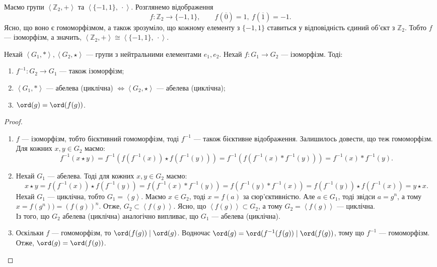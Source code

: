 \documentclass{math_library}
\begin{document}
\begin{example}
Маємо групи $\left<\mathbb{Z}_2,+ \right>$ та $\left< \{-1,1\},\ \cdot \right>$. Розглянемо відображення \[ 
f \colon \mathbb{Z}_2 \to \{-1,1\}, \qquad f(\overline{0}) = 1,\ f(\overline{1}) = -1.
\]
Ясно, що воно є гомоморфізмом, а також зрозуміло, що кожному елементу з $\{-1,1\}$ ставиться у відповідність єдиний об'єкт з $\mathbb{Z}_2$.  Тобто $f$ --- ізоморфізм, а значить, $\left<\mathbb{Z}_2,+ \right> \cong \left<\{-1,1\},\ \cdot \right>$.
\end{example}

\begin{theorem}
Нехай $\left<G_1, *\right>, \left<G_2, \star \right>$ --- групи з нейтральними елементами $e_1,e_2$. Нехай $f \colon G_1 \to G_2$ --- ізоморфізм. Тоді:
\begin{enumerate}[nosep,wide=0pt,label={\arabic*)}]
\item $f^{-1} \colon G_2 \to G_1$ --- також ізоморфізм;
\item $\left< G_1, * \right>$ --- абелева (циклічна) $\iff \left< G_2, \star \right>$ --- абелева (циклічна);
\item $\ord(g) = \ord(f(g))$.
\end{enumerate}
\end{theorem}

\begin{proof}
\begin{enumerate}[topsep=0pt,wide=0pt,label={\arabic*)}]
\item $f$ --- ізоморфізм, тобто бієктивний гомоморфізм, тоді $f^{-1}$ --- також бієктивне відображення. Залишилось довести, що теж гомоморфізм. Для кожних $x,y \in G_2$ маємо:
\[
f^{-1}(x \star y) = f^{-1}(f(f^{-1}(x)) \star f(f^{-1}(y)))  = f^{-1}(f(f^{-1}(x)*f^{-1}(y))) = f^{-1}(x)*f^{-1}(y).
\]

\item Нехай $G_1$ --- абелева. Тоді для кожних $x,y \in G_2$ маємо:
\[
x \star y = f(f^{-1}(x)) \star f(f^{-1}(y)) = f(f^{-1}(x) * f^{-1}(y)) = f(f^{-1}(y) * f^{-1}(x)) = f(f^{-1}(y)) \star f(f^{-1}(x)) = y \star x.
\]
Нехай $G_1$ --- циклічна, тобто $G_1 = \left<g\right>$. Маємо $x \in G_2$, тоді $x = f(a)$ за сюр'єктивністю. Але $a \in G_1$, тоді звідси $a = g^n$, а тому $x = f(g^n)) = (f(g))^n$. Отже, $G_2 \subset \left<f(g)\right>$. Ясно, що $\left<f(g)\right> \subset G_2$, а тому $G_2 = \left<f(g)\right>$ --- циклічна.\\
Із того, що $G_2$ абелева (циклічна) аналогічно випливає, що $G_1$ --- абелева (циклічна).

\item Оскільки $f$ --- гомоморфізм, то $\ord(f(g)) \mid \ord(g)$. Водночас $\ord(g) = \ord(f^{-1}(f(g)) \mid \ord(f(g))$, тому що $f^{-1}$ --- гомоморфізм. Отже, $\ord(g) = \ord(f(g))$. \qedhere
\end{enumerate}
\end{proof}
\end{document}
